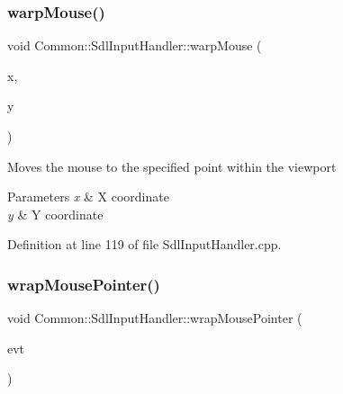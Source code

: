 \mbox{\label{class_common_1_1_sdl_input_handler_a589923be034191404d6597dfc8cee282}} 
\subsubsection{\texorpdfstring{warp\+Mouse()}{warpMouse()}}
{\footnotesize\ttfamily void Common\+::\+Sdl\+Input\+Handler\+::warp\+Mouse (\begin{DoxyParamCaption}\item[{int}]{x,  }\item[{int}]{y }\end{DoxyParamCaption})\hspace{0.3cm}{\ttfamily [private]}}

Moves the mouse to the specified point within the viewport 
\begin{DoxyParams}{Parameters}
{\em x} & X coordinate \\
\hline
{\em y} & Y coordinate \\
\hline
\end{DoxyParams}


Definition at line 119 of file Sdl\+Input\+Handler.\+cpp.

\mbox{\label{class_common_1_1_sdl_input_handler_aa73cf0ac43983be445f0fcf11e91eeef}} 
\subsubsection{\texorpdfstring{wrap\+Mouse\+Pointer()}{wrapMousePointer()}}
{\footnotesize\ttfamily void Common\+::\+Sdl\+Input\+Handler\+::wrap\+Mouse\+Pointer (\begin{DoxyParamCaption}\item[{const \hyperlink{struct_s_d_l___mouse_motion_event}{S\+D\+L\+\_\+\+Mouse\+Motion\+Event} \&}]{evt }\end{DoxyParamCaption})\hspace{0.3cm}{\ttfamily [private]}}

